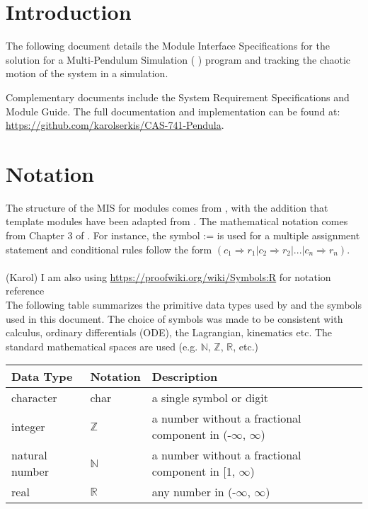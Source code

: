 \documentclass[12pt, titlepage]{article}
\begin{document}
\newpage

\tableofcontents

\newpage


\section{Introduction}

The following document details the Module Interface Specifications for the 
solution for a Multi-Pendulum Simulation ( \progname) program and tracking the 
chaotic motion of the system in a simulation.

Complementary documents include the System Requirement Specifications
and Module Guide. The full documentation and implementation can be
found at: \\\url{https://github.com/karolserkis/CAS-741-Pendula}.

\section{Notation}

The structure of the MIS for modules comes from \citet{HoffmanAndStrooper1995},
with the addition that template modules have been adapted from
\cite{GhezziEtAl2003}.  The mathematical notation comes 
from Chapter 3 of \citet{HoffmanAndStrooper1995}.  
For instance, the symbol := is used for a multiple assignment statement and 
conditional rules follow the form 
$(c_1 \Rightarrow r_1 | c_2 \Rightarrow r_2 | ... | c_n \Rightarrow r_n )$.\\\\
(Karol) I am also using \url{https://proofwiki.org/wiki/Symbols:R} 
for notation reference\\

The following table summarizes the primitive data types used by \progname and 
the symbols used in this document.
The choice of symbols was made to be consistent with calculus, ordinary
differentials (ODE), the Lagrangian, kinematics etc. The standard mathematical
spaces are used (e.g. $\mathbb{N}$, $\mathbb{Z}$, $\mathbb{R}$, etc.)

\begin{center}
\renewcommand{\arraystretch}{1.2}
\noindent 
\begin{tabular}{l l p{7.5cm}} 
\toprule 
\textbf{Data Type} & \textbf{Notation} & \textbf{Description}\\ 
\midrule
character & char & a single symbol or digit\\
integer & $\mathbb{Z}$ & a number without a fractional component in 
(-$\infty$, $\infty$) \\
natural number & $\mathbb{N}$ & a number without a fractional component in 
[1, $\infty$) \\
real & $\mathbb{R}$ & any number in (-$\infty$, $\infty$)\\
\bottomrule
\end{tabular} 
\end{center}
\end{document}
